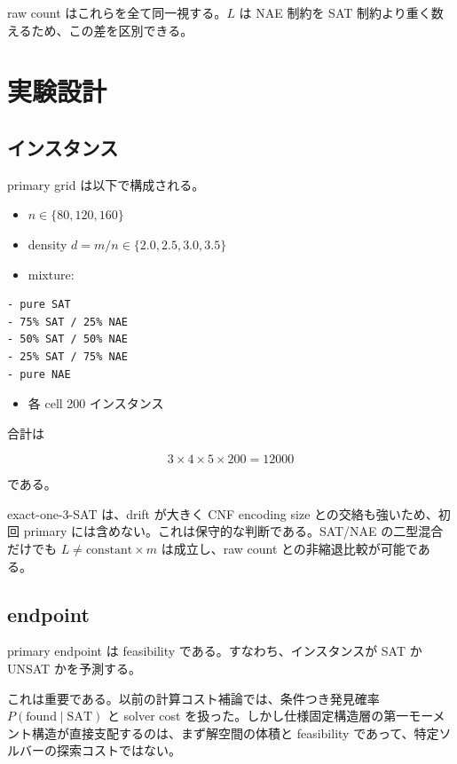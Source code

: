 \documentclass[12pt,a4paper]{article}
\begin{document}
raw count はこれらを全て同一視する。\(L\) は NAE 制約を SAT 制約より重く数えるため、この差を区別できる。

\section{実験設計}\label{ux5b9fux9a13ux8a2dux8a08}

\subsection{インスタンス}\label{ux30a4ux30f3ux30b9ux30bfux30f3ux30b9}

primary grid は以下で構成される。

\begin{itemize}
\tightlist
\item
  \(n\in\{80,120,160\}\)
\item
  density \(d=m/n\in\{2.0,2.5,3.0,3.5\}\)
\item
  mixture:
\end{itemize}

\begin{verbatim}
- pure SAT
- 75% SAT / 25% NAE
- 50% SAT / 50% NAE
- 25% SAT / 75% NAE
- pure NAE
\end{verbatim}

\begin{itemize}
\tightlist
\item
  各 cell 200 インスタンス
\end{itemize}

合計は

\[
3\times 4\times 5\times 200=12000
\]

である。

exact-one-3-SAT は、drift が大きく CNF encoding size との交絡も強いため、初回 primary には含めない。これは保守的な判断である。SAT/NAE の二型混合だけでも \(L\neq \mathrm{constant}\times m\) は成立し、raw count との非縮退比較が可能である。

\subsection{endpoint}\label{endpoint}

primary endpoint は feasibility である。すなわち、インスタンスが SAT か UNSAT かを予測する。

これは重要である。以前の計算コスト補論では、条件つき発見確率 \(P(\mathrm{found}\mid\mathrm{SAT})\) と solver cost を扱った。しかし仕様固定構造層の第一モーメント構造が直接支配するのは、まず解空間の体積と feasibility であって、特定ソルバーの探索コストではない。
\end{document}
